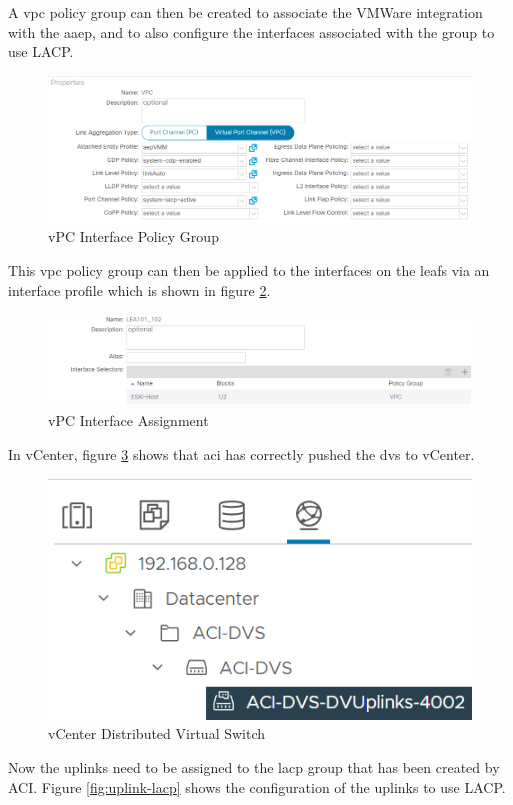 A \gls{vpc} policy group can then be created to associate the VMWare
integration with the \gls{aaep}, and to also configure the interfaces
associated with the group to use LACP.

\begin{figure}[H]
    
    \centering
    \includegraphics[scale=0.7]{images/vpc-interface-policy.png}
    
    \caption{vPC Interface Policy Group}
    \label{fig:vpc-int-pol}
\end{figure}

This \gls{vpc} policy group can then be applied to the interfaces on the leafs
via an interface profile which is shown in figure
\ref{fig:vpc-interface-assignment}.
\begin{figure}[H]
    
    \centering
    \includegraphics[scale=0.7]{images/vpc-interface-assignment.png}
    
    \caption{vPC Interface Assignment}
    \label{fig:vpc-interface-assignment}
\end{figure}

In vCenter, figure \ref{fig:vcenter-dvs} shows that \gls{aci} has correctly
pushed the \gls{dvs} to vCenter.

\begin{figure}[H]
    
    \centering
    \includegraphics[scale=0.7]{images/vcenter-dvs.png}
    
    \caption{vCenter Distributed Virtual Switch}
    \label{fig:vcenter-dvs}
\end{figure}
Now the uplinks need to be assigned to the \gls{lacp} group that has been
created by ACI. Figure \ref{fig:uplink-lacp} shows the configuration of the
uplinks to use LACP.

